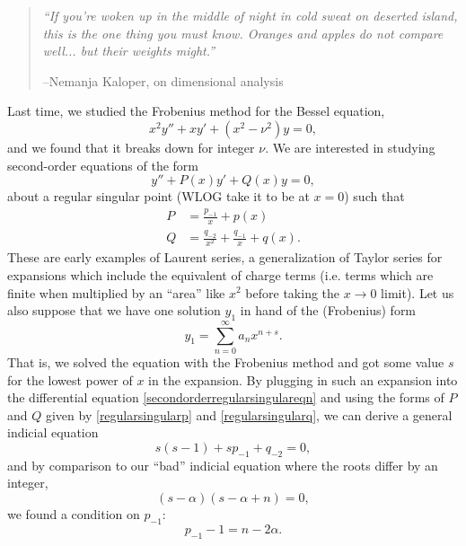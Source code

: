 \begin{quote}
    \textit{``If you're woken up in the middle of night in cold sweat on deserted island, this is the one thing you must know. Oranges and apples do not compare well... but their weights might.''}
    
    --Nemanja Kaloper, on dimensional analysis
\end{quote}
Last time, we studied the Frobenius method for the Bessel equation, 
\begin{equation}
    x^2 y'' + x y' + (x^2-\nu^2) y=0,
\end{equation}
and we found that it breaks down for integer $\nu$. We are interested in studying second-order equations of the form
\begin{equation}\label{secondorderregularsingulareqn}
    y'' + P(x) y' + Q(x) y = 0,
\end{equation}
about a regular singular point (WLOG take it to be at $x=0$) such that
\begin{subequations}
\begin{align}
    P &= \frac{p_{-1}}{x} + p(x)\label{regularsingularp}\\
    Q &= \frac{q_{-2}}{x^2} + \frac{q_{-1}}{x} + q(x).\label{regularsingularq}
\end{align}
\end{subequations}
These are early examples of Laurent series, a generalization of Taylor series for expansions which include the equivalent of charge terms (i.e. terms which are finite when multiplied by an ``area'' like $x^2$ before taking the $x\to 0$ limit). Let us also suppose that we have one solution $y_1$ in hand of the (Frobenius) form
\begin{equation}
    y_1 = \sum_{n=0}^\infty a_n x^{n+s}.
\end{equation}
That is, we solved the equation with the Frobenius method and got some value $s$ for the lowest power of $x$ in the expansion. By plugging in such an expansion into the differential equation \ref{secondorderregularsingulareqn} and using the forms of $P$ and $Q$ given by \ref{regularsingularp} and \ref{regularsingularq}, we can derive a general indicial equation
\begin{equation}
    s(s-1) + sp_{-1} + q_{-2} = 0,
\end{equation}
and by comparison to our ``bad'' indicial equation where the roots differ by an integer,
\begin{equation}
    (s-\alpha)(s-\alpha+n)=0,
\end{equation}
we found a condition on $p_{-1}$:
\begin{equation}
    p_{-1}-1 = n - 2\alpha.
\end{equation}

